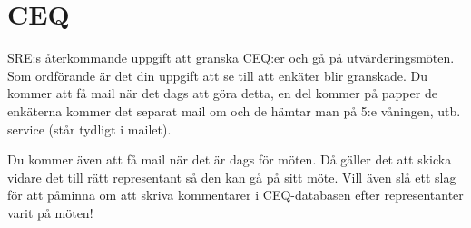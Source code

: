 \documentclass[10pt]{article}
\begin{document}
\section{CEQ}
SRE:s återkommande uppgift att granska CEQ:er och gå på utvärderingsmöten. Som ordförande är det din uppgift att se till att enkäter blir granskade. Du kommer att få mail när det dags att göra detta, en del kommer på papper de enkäterna kommer det separat mail om och de hämtar man på 5:e våningen, utb. service (står tydligt i mailet). 

Du kommer även att få mail när det är dags för möten. Då gäller det att skicka vidare det till rätt representant så den kan gå på sitt möte. Vill även slå ett slag för att påminna om att skriva kommentarer i CEQ-databasen efter representanter varit på möten!

\newpage
\end{document}
